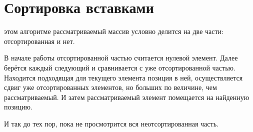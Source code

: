\section{Сортировка вставками}
 этом алгоритме рассматриваемый массив условно делится на две части: отсортированная и нет. 

В начале работы отсортированной частью считается нулевой элемент. Далее берётся каждый следующий и сравнивается с уже отсортированной частью. Находится подходящая для текущего элемента позиция в ней, осуществляется сдвиг уже отсортированных элементов, но больших по величине, чем рассматриваемый. И затем рассматриваемый элемент помещается на найденную позицию.

И так до тех пор, пока не просмотрится вся неотсортированная часть.\\ 

